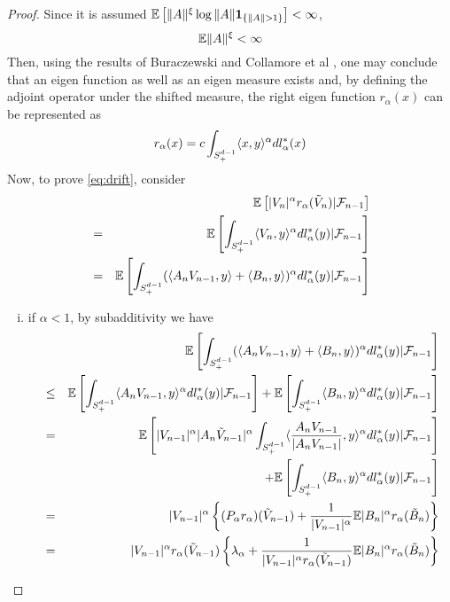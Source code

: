 \documentclass{article}
\begin{document}
\begin{proof}
  Since it is assumed $\mathbb{E}\left[\|A\|^{\xi} \log\|A\|\mathbf{1}_{\{\|A\| > 1\}}
  \right] < \infty$,
  \[
  \mathbb{E} \|A\|^\xi < \infty
  \]
  Then, using the results of Buraczewski and Collamore et al
  \cite{BCDZ2014}, one may conclude that an eigen function as well as
  an eigen measure exists and, by defining the adjoint operator under
  the shifted measure, the right eigen function $r_{\alpha}(x)$ can be
  represented as
  \[
  r_{\alpha}(x) = c \int_{S_+^{d-1}} \langle x, y\rangle^\alpha dl^*_{\alpha}(x)
  \]
Now, to prove \eqref{eq:drift}, consider
  \begin{eqnarray*}
    && \mathbb{E} \left[ |V_n|^\alpha r_{\alpha}(\tilde V_n) | \mathcal F_{n-1} \right]
    \\
    &=& \mathbb{E}\left[\int_{S_+^{d-1}} \langle V_n, y\rangle^\alpha dl^*_{\alpha}(y)|
      \mathcal F_{n-1} \right]
    \\
    &=& \mathbb{E}\left[\int_{S_+^{d-1}} (\langle A_n V_{n-1}, y\rangle + \langle B_n,
        y\rangle)^\alpha dl^*_{\alpha}(y) | \mathcal F_{n-1} \right]
  \end{eqnarray*}
  \begin{enumerate}[(i)]
  \item if $\alpha < 1$, by subadditivity we have
    \begin{eqnarray*}
      &&\E\left[\int_{S_+^{d-1}} (\inn{A_n V_{n-1}, y} + \inn{B_n,
          y})^\alpha dl^*_{\alpha}(y) | \mathcal F_{n-1} \right]\\
      &\leq& \E\left[\int_{S_+^{d-1}} \inn{A_n V_{n-1}, y}^\alpha
        dl^*_{\alpha}(y) | \mathcal F_{n-1} \right]
      + \E\left[\int_{S_+^{d-1}} \inn{B_n, y}^\alpha dl^*_{\alpha}(y) |
        \mathcal F_{n-1} \right] \\
      &=& \E\left[|V_{n-1}|^\alpha |A_n \tilde V_{n-1}|^\alpha\int_{S_+^{d-1}}
        \inn{{A_n V_{n-1} \over |A_n V_{n-1}|}, y}^\alpha
        dl^*_{\alpha}(y) | \mathcal F_{n-1} \right] \\
      && + \E\left[\int_{S_+^{d-1}} \inn{B_n, y}^\alpha dl^*_{\alpha}(y) |
        \mathcal F_{n-1} \right] \\
      &=& |V_{n-1}|^\alpha \left\{
        (P_{\alpha} r_{\alpha})(\tilde V_{n-1}) +
        {1 \over |V_{n-1}|^\alpha} \E |B_n|^\alpha r_{\alpha}(\tilde
        B_n) \right\} \\
      &=& |V_{n-1}|^\alpha r_{\alpha}(\tilde V_{n-1})\left\{
        \lambda_{\alpha} +
        {1 \over |V_{n-1}|^\alpha r_{\alpha}(\tilde V_{n-1})} \E
        |B_n|^\alpha r_{\alpha}(\tilde B_n) \right\} \\

\end{eqnarray*}
\end{enumerate}
\end{proof}
\end{document}
